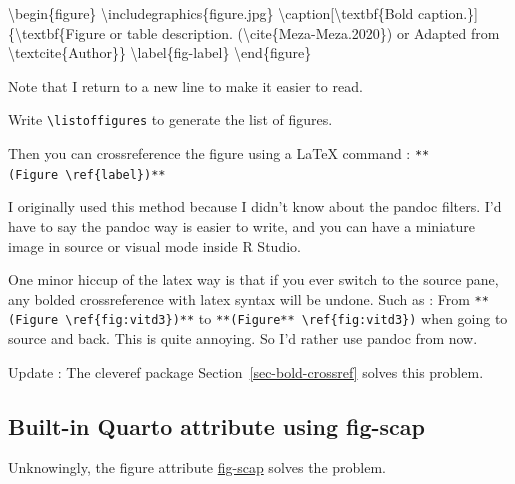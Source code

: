 \documentclass[
  letterpaper,
  DIV=11,
  numbers=noendperiod]{scrreprt}
\newenvironment{Shaded}{\begin{snugshade}}{\end{snugshade}}
\newcommand{\BuiltInTok}[1]{\textcolor[rgb]{0.00,0.23,0.31}{#1}}
\newcommand{\ExtensionTok}[1]{\textcolor[rgb]{0.00,0.23,0.31}{#1}}
\newcommand{\FunctionTok}[1]{\textcolor[rgb]{0.28,0.35,0.67}{#1}}
\newcommand{\KeywordTok}[1]{\textcolor[rgb]{0.00,0.23,0.31}{#1}}
\newcommand{\NormalTok}[1]{\textcolor[rgb]{0.00,0.23,0.31}{#1}}
\begin{document}
\begin{Shaded}
\begin{Highlighting}[]
\KeywordTok{\textbackslash{}begin}\NormalTok{\{}\ExtensionTok{figure}\NormalTok{\}}
\BuiltInTok{\textbackslash{}includegraphics}\NormalTok{\{}\ExtensionTok{figure.jpg}\NormalTok{\} }
\FunctionTok{\textbackslash{}caption}\NormalTok{[}\FunctionTok{\textbackslash{}textbf}\NormalTok{\{Bold caption.\}]}
\NormalTok{\{}\FunctionTok{\textbackslash{}textbf}\NormalTok{\{Figure or table description. (}\KeywordTok{\textbackslash{}cite}\NormalTok{\{}\ExtensionTok{Meza{-}Meza.2020}\NormalTok{\}) or Adapted from }\KeywordTok{\textbackslash{}textcite}\NormalTok{\{}\ExtensionTok{Author}\NormalTok{\}\}}
\KeywordTok{\textbackslash{}label}\NormalTok{\{}\ExtensionTok{fig{-}label}\NormalTok{\}}
\KeywordTok{\textbackslash{}end}\NormalTok{\{}\ExtensionTok{figure}\NormalTok{\}}
\end{Highlighting}
\end{Shaded}

Note that I return to a new line to make it easier to read.

Write \texttt{\textbackslash{}listoffigures} to generate the list of
figures.

Then you can crossreference the figure using a LaTeX command :
\texttt{**(Figure\ \textbackslash{}ref\{label\})**}

I originally used this method because I didn't know about the pandoc
filters. I'd have to say the pandoc way is easier to write, and you can
have a miniature image in source or visual mode inside R Studio.

One minor hiccup of the latex way is that if you ever switch to the
source pane, any bolded crossreference with latex syntax will be undone.
Such as : From \texttt{**(Figure\ \textbackslash{}ref\{fig:vitd3\})**}
to \texttt{**(Figure**\ \textbackslash{}ref\{fig:vitd3\})} when going to
source and back. This is quite annoying. So I'd rather use pandoc from
now.

Update : The cleveref package Section~\ref{sec-bold-crossref} solves
this problem.

\hypertarget{built-in-quarto-attribute-using-fig-scap}{%
\subsection{Built-in Quarto attribute using
fig-scap}\label{built-in-quarto-attribute-using-fig-scap}}

Unknowingly, the figure attribute
\href{https://quarto.org/docs/reference/cells/cells-knitr.html\#figures}{fig-scap}
solves the problem.
\end{document}
